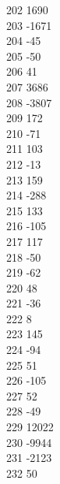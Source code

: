 { 202	1690 \\
 203	-1671 \\
 204	-45 \\
 205	-50 \\
 206	41 \\
 207	3686 \\
 208	-3807 \\
 209	172 \\
 210	-71 \\
 211	103 \\
 212	-13 \\
 213	159 \\
 214	-288 \\
 215	133 \\
 216	-105 \\
 217	117 \\
 218	-50 \\
 219	-62 \\
 220	48 \\
 221	-36 \\
 222	8 \\
 223	145 \\
 224	-94 \\
 225	51 \\
 226	-105 \\
 227	52 \\
 228	-49 \\
 229	12022 \\
 230	-9944 \\
 231	-2123 \\
 232	50 \\
}
